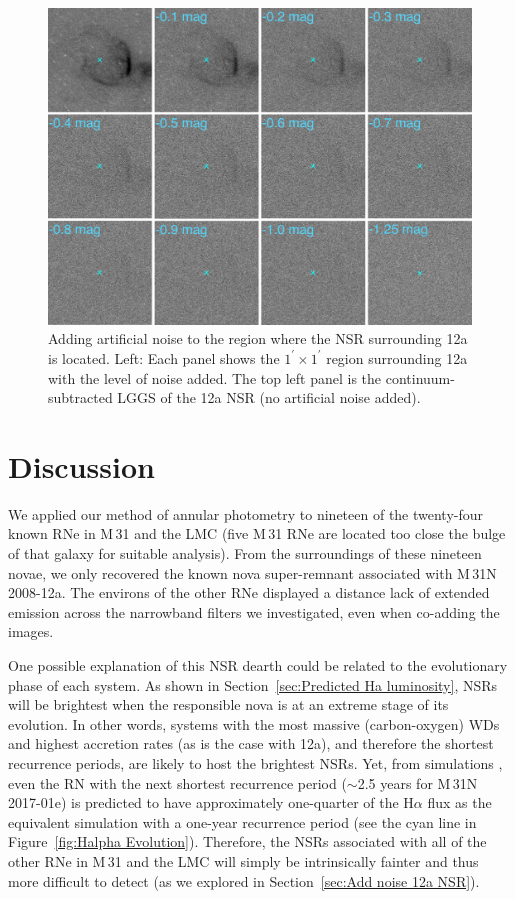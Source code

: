 \documentclass[fleqn,usenatbib]{mnras}
\begin{document}
\begin{figure}
\centering
\includegraphics[width=\columnwidth]{Figures/Add_Noise_12a_mag.pdf}
\caption{Adding artificial noise to the region where the NSR surrounding 12a is located. Left: Each panel shows the $1^{\prime} \times 1^{\prime}$ region surrounding 12a with the level of noise added. The top left panel is the continuum-subtracted LGGS of the 12a NSR (no artificial noise added).}
\label{fig:12a add noise}
\end{figure}

\section{Discussion}\label{sec:Discussion}
We applied our method of annular photometry to nineteen of the twenty-four known RNe in M\,31 and the LMC (five M\,31 RNe are located too close the bulge of that galaxy for suitable analysis). From the surroundings of these nineteen novae, we only recovered the known nova super-remnant associated with M\,31N 2008-12a. The environs of the other RNe displayed a distance lack of extended emission across the narrowband filters we investigated, even when co-adding the images.

One possible explanation of this NSR dearth could be related to the evolutionary phase of each system. As shown in Section~\ref{sec:Predicted Ha luminosity}, NSRs will be brightest when the responsible nova is at an extreme stage of its evolution. In other words, systems with the most massive (carbon-oxygen) WDs and highest accretion rates (as is the case with 12a), and therefore the shortest recurrence periods, are likely to host the brightest NSRs. Yet, from simulations \citep{2023MNRAS.521.3004H}, even the RN with the next shortest recurrence period (${\sim}$2.5 years for M\,31N 2017-01e) is predicted to have approximately one-quarter of the H$\alpha$ flux as the equivalent simulation with a one-year recurrence period (see the cyan line in Figure~\ref{fig:Halpha Evolution}). Therefore, the NSRs associated with all of the other RNe in M\,31 and the LMC will simply be intrinsically fainter and thus more difficult to detect (as we explored in Section~\ref{sec:Add noise 12a NSR}).
\end{document}
